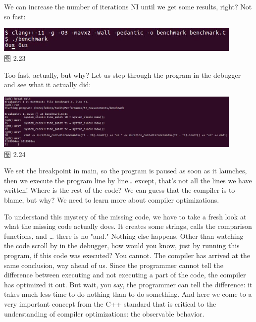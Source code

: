 We can increase the number of iterations NI until we get some results, right? Not so fast:

\begin{center}
\includegraphics[width=0.9\textwidth]{content/1/chapter2/images/23.jpg}\\
图 2.23
\end{center}

Too fast, actually, but why? Let us step through the program in the debugger and see what it actually did:

\begin{center}
\includegraphics[width=0.9\textwidth]{content/1/chapter2/images/24.jpg}\\
图 2.24
\end{center}

We set the breakpoint in main, so the program is paused as soon as it launches, then we execute the program line by line… except, that's not all the lines we have written! Where is the rest of the code? We can guess that the compiler is to blame, but why? We need to learn more about compiler optimizations.


To understand this mystery of the missing code, we have to take a fresh look at what the missing code actually does. It creates some strings, calls the comparison functions, and … there is no "and." Nothing else happens. Other than watching the code scroll by in the debugger, how would you know, just by running this program, if this code was executed? You cannot. The compiler has arrived at the same conclusion, way ahead of us. Since the programmer cannot tell the difference between executing and not executing a part of the code, the compiler has optimized it out. But wait, you say, the programmer can tell the difference: it takes much less time to do nothing than to do something. And here we come to a very important concept from the C++ standard that is critical to the understanding of compiler optimizations: the observable behavior.

